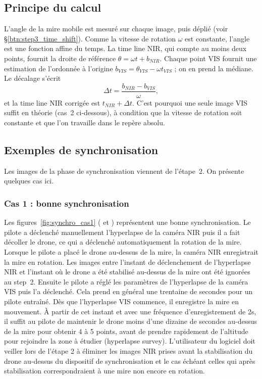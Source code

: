 \documentclass[a4paper,11pt]{report}
\begin{document}
\subsection{Principe du calcul}
L'angle de la mire mobile est mesuré sur chaque image, puis déplié (voir §\ref{btn:step3_time_shift}). Comme la vitesse de rotation $\omega$ est constante, l'angle est une fonction affine du temps. La time line NIR, qui compte au moins deux points, fournit la droite de référence $\theta = \omega t + b_{NIR}$. Chaque point VIS fournit une estimation de l'ordonnée à l'origine $b_{VIS} = \theta_{VIS} - \omega t_{VIS}$ ; on en prend la médiane. Le décalage s'écrit
\begin{equation}
  \Delta t = \frac{b_{NIR} - b_{VIS}}{\omega},
\end{equation}
et la time line NIR corrigée est $t_{NIR} + \Delta t$. C'est pourquoi une seule image VIS suffit en théorie (cas~2 ci-dessous), à condition que la vitesse de rotation soit constante et que l'on travaille dans le repère absolu.

\subsection{Exemples de synchronisation}\label{sec:step3_examples}
Les images de la phase de synchronisation viennent de l'étape~2. On présente quelques cas ici.

\subsubsection{Cas 1 : bonne synchronisation}
Les figures~\ref{fig:synchro_cas1} ( et ) représentent une bonne synchronisation. Le pilote a déclenché manuellement l'hyperlapse de la caméra NIR puis il a fait décoller le drone, ce qui a déclenché automatiquement la rotation de la mire. Lorsque le pilote a placé le drone au-dessus de la mire, la caméra NIR enregistrait la mire en rotation. Les images entre l'instant de déclenchement de l'hyperlapse NIR et l'instant où le drone a été stabilisé au-dessus de la mire ont été ignorées au step~2. Ensuite le pilote a réglé les paramètres de l'hyperlapse de la caméra VIS puis l'a déclenché. Cela prend en général une trentaine de secondes pour un pilote entraîné. Dès que l'hyperlapse VIS commence, il enregistre la mire en mouvement. À partir de cet instant et avec une fréquence d'enregistrement de 2s, il suffit au pilote de maintenir le drone moins d'une dizaine de secondes au-dessus de la mire pour obtenir 4 à 5 points, avant de prendre rapidement de l'altitude pour rejoindre la zone à étudier (hyperlapse survey). L'utilisateur du logiciel doit veiller lors de l'étape 2 à éliminer les images NIR prises avant la stabilisation du drone au-dessus du dispositif de synchronisation et le cas échéant celles qui après stabilisation correspondraient à une mire non encore en rotation. 
\end{document}

